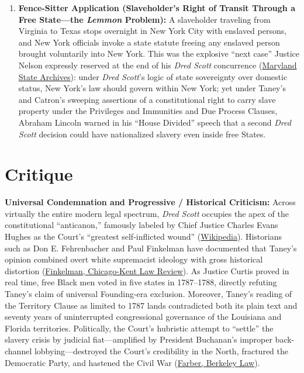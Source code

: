 \documentclass[12pt]{article}
\begin{document}
\begin{enumerate}
  \item \textbf{Fence-Sitter Application (Slaveholder's Right of Transit Through a Free State---the \textit{Lemmon} Problem):} A slaveholder traveling from Virginia to Texas stops overnight in New York City with enslaved persons, and New York officials invoke a state statute freeing any enslaved person brought voluntarily into New York. This was the explosive ``next case'' Justice Nelson expressly reserved at the end of his \textit{Dred Scott} concurrence (\href{https://msa.maryland.gov/megafile/msa/speccol/sc5300/sc5339/000091/000000/000004/restricted/dred_scott/decision/nelson.html}{Maryland State Archives}): under \textit{Dred Scott}'s logic of state sovereignty over domestic status, New York's law should govern within New York; yet under Taney's and Catron's sweeping assertions of a constitutional right to carry slave property under the Privileges and Immunities and Due Process Clauses, Abraham Lincoln warned in his ``House Divided'' speech that a second \textit{Dred Scott} decision could have nationalized slavery even inside free States.
\end{enumerate}

\section{Critique}

\textbf{Universal Condemnation and Progressive / Historical Criticism:} Across virtually the entire modern legal spectrum, \textit{Dred Scott} occupies the apex of the constitutional ``anticanon,'' famously labeled by Chief Justice Charles Evans Hughes as the Court's ``greatest self-inflicted wound'' (\href{https://en.wikipedia.org/wiki/Dred_Scott_v._Sandford}{Wikipedia}). Historians such as Don E. Fehrenbacher and Paul Finkelman have documented that Taney's opinion combined overt white supremacist ideology with gross historical distortion (\href{https://studentorgs.kentlaw.iit.edu/cklawreview/wp-content/uploads/sites/3/vol82no1/Finkelman.pdf}{Finkelman, Chicago-Kent Law Review}). As Justice Curtis proved in real time, free Black men voted in five states in 1787--1788, directly refuting Taney's claim of universal Founding-era exclusion. Moreover, Taney's reading of the Territory Clause as limited to 1787 lands contradicted both its plain text and seventy years of uninterrupted congressional governance of the Louisiana and Florida territories. Politically, the Court's hubristic attempt to ``settle'' the slavery crisis by judicial fiat---amplified by President Buchanan's improper back-channel lobbying---destroyed the Court's credibility in the North, fractured the Democratic Party, and hastened the Civil War (\href{https://lawcat.berkeley.edu/record/1124652/files/fulltext.pdf}{Farber, Berkeley Law}).
\end{document}
